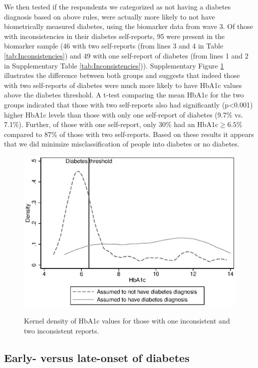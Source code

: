 \documentclass[12pt,english]{article}
\begin{document}
We then tested if the respondents we categorized as not having a diabetes diagnosis based on above rules, were actually more likely to not have biometrically measured diabetes, using the biomarker data from wave 3. Of those with inconsistencies in their diabetes self-reports, 95 were present in the biomarker sample (46 with two self-reports (from lines 3 and 4 in Table \ref{tab:Inconsistencies}) and 49 with one self-report of diabetes (from lines 1 and 2 in Supplementary Table \ref{tab:Inconsistencies})). Supplementary Figure \ref{fig:kdens_inconsistency_hba1c} illustrates the difference between both groups and suggests that indeed those with two self-reports of diabetes were much more likely to have \ac{HbA1c} values above the diabetes threshold. A t-test comparing the mean \ac{HbA1c} for the two groups indicated that those with two self-reports also had significantly (p<0.001) higher \ac{HbA1c} levels than those with only one self-report of diabetes (9.7\% vs. 7.1\%). Further, of those with one self-report,  only 30\% had an \ac{HbA1c}$\geq6.5$\% compared to 87\% of those with two self-reports. Based on these results it appears that we did minimize misclassification of people into diabetes or no diabetes. 

\begin{figure}[h!]
	\caption{\label{fig:kdens_inconsistency_hba1c}Kernel density of HbA1c values for those with one inconsistent and two inconsistent reports.}%
	\begin{center}
		\includegraphics[width=.7\linewidth]{figures/kdensity_hba1c_inconsist.eps}\\
	\end{center}
\end{figure}


\clearpage

\subsection*{Early- versus late-onset of diabetes}
\end{document}
